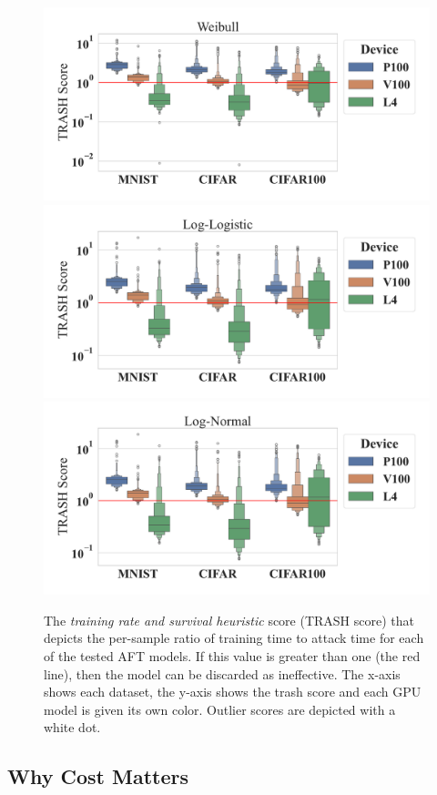 \documentclass[sn-mathphys-num]{sn-jnl}%
\begin{document}
\begin{figure}[tph!]
    \centering
        \includegraphics[width=.49\linewidth]{plots/combined/weibull_trash_score.pdf}
        \includegraphics[width=.49\linewidth]{plots/combined/log_logistic_trash_score.pdf}
        \includegraphics[width=.49\linewidth]{plots/combined/log_normal_trash_score.pdf}
    \caption{The \textit{training rate and survival heuristic} score (TRASH score) that depicts the per-sample ratio of training time to attack time for each of the tested AFT models.
    If this value is greater than one (the red line), then the model can be discarded as ineffective. The x-axis shows each dataset, the y-axis shows the \acrshort{trash} score and each GPU model is given its own color. Outlier scores are depicted with a white dot.}
    \label{fig:trash}
\end{figure}

\subsection{Why Cost Matters}
\end{document}

